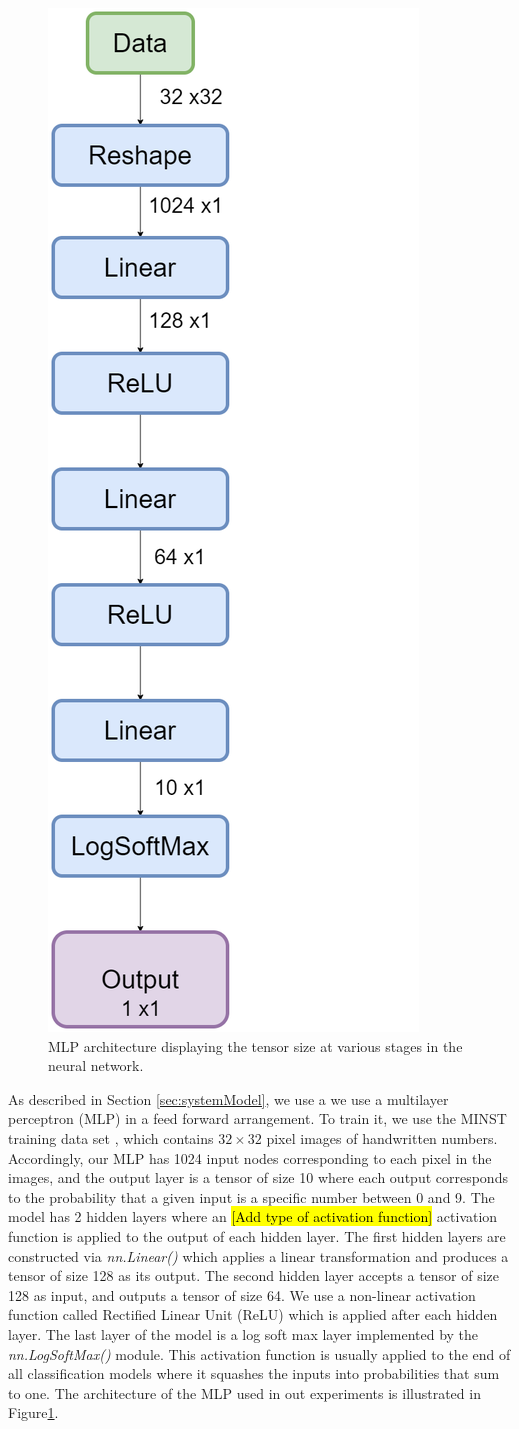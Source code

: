 \documentclass[conference]{IEEEtran}
\begin{document}
\begin{figure}[t]
\centering
\includegraphics[width = 0.3\columnwidth, keepaspectratio]{NNArchitecture}
\caption{MLP architecture displaying the tensor size at various stages in the neural network. }
\label{fig:MLPArch}
\end{figure}
As described in Section \ref{sec:systemModel}, we use a 
we use a multilayer perceptron (MLP) in a feed forward arrangement. To train it, we use the MINST training data set \cite{deng2012mnist}, which contains 
$32\times 32$ pixel images of handwritten numbers. Accordingly, our MLP has 1024 input nodes
corresponding to each pixel in the images, and the output layer is a tensor of size 10 where each output corresponds to the probability
that a given input is a specific number
between 0 and 9.  The model has 2 hidden layers where an \hl{
[Add type of activation function]} activation function is applied to the
output of each hidden layer.  The first hidden layers are constructed via \textit{nn.Linear()} which applies a linear transformation
and produces a tensor of size 128 as its output. The second hidden layer accepts a tensor of size 128 as input, and outputs a tensor of
size 64. We use a non-linear activation function called Rectified Linear Unit (ReLU) which is applied after each hidden
layer. The last layer of the model is a log soft max layer implemented by the \textit{nn.LogSoftMax()} module.  This activation
function is usually applied to the end of all classification models where it squashes the inputs into probabilities that sum to one.
The architecture of the MLP used in out experiments is illustrated in Figure\ref{fig:MLPArch}.
\end{document}

